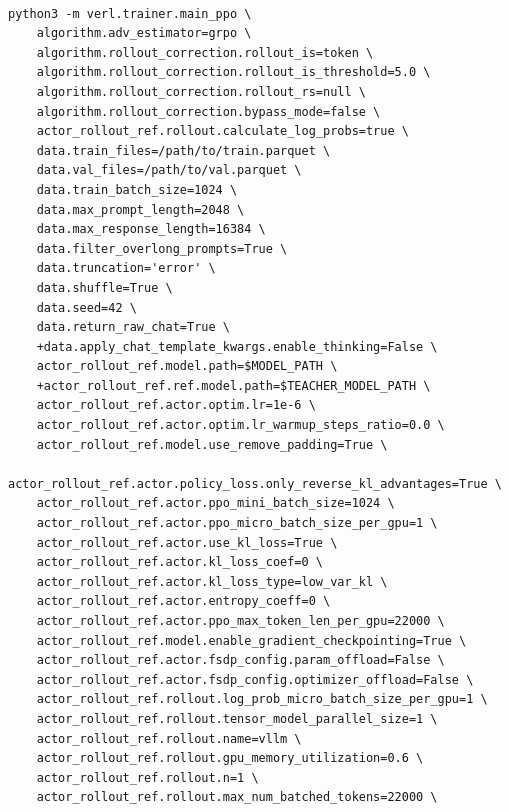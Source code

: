 \documentclass{article}
\begin{document}
\begin{tcolorbox}[
    colback=gray!5,          %
    colframe=gray!70,        %
    arc=3pt,                 %
    left=2pt,
    right=2pt,
    top=2pt,
    bottom=2pt,
    boxrule=0.5pt,           %
    breakable,               %
    fontupper=\small,
    listing only,            %
    listing options={language=Python}, %
    title=OPD Training Command, %
    title style={color=black},          %
    label=py1                %
]
\begin{verbatim}

python3 -m verl.trainer.main_ppo \
    algorithm.adv_estimator=grpo \
    algorithm.rollout_correction.rollout_is=token \
    algorithm.rollout_correction.rollout_is_threshold=5.0 \
    algorithm.rollout_correction.rollout_rs=null \
    algorithm.rollout_correction.bypass_mode=false \
    actor_rollout_ref.rollout.calculate_log_probs=true \
    data.train_files=/path/to/train.parquet \
    data.val_files=/path/to/val.parquet \
    data.train_batch_size=1024 \
    data.max_prompt_length=2048 \
    data.max_response_length=16384 \
    data.filter_overlong_prompts=True \
    data.truncation='error' \
    data.shuffle=True \
    data.seed=42 \
    data.return_raw_chat=True \
    +data.apply_chat_template_kwargs.enable_thinking=False \
    actor_rollout_ref.model.path=$MODEL_PATH \
    +actor_rollout_ref.ref.model.path=$TEACHER_MODEL_PATH \
    actor_rollout_ref.actor.optim.lr=1e-6 \
    actor_rollout_ref.actor.optim.lr_warmup_steps_ratio=0.0 \
    actor_rollout_ref.model.use_remove_padding=True \
    actor_rollout_ref.actor.policy_loss.only_reverse_kl_advantages=True \
    actor_rollout_ref.actor.ppo_mini_batch_size=1024 \
    actor_rollout_ref.actor.ppo_micro_batch_size_per_gpu=1 \
    actor_rollout_ref.actor.use_kl_loss=True \
    actor_rollout_ref.actor.kl_loss_coef=0 \
    actor_rollout_ref.actor.kl_loss_type=low_var_kl \
    actor_rollout_ref.actor.entropy_coeff=0 \
    actor_rollout_ref.actor.ppo_max_token_len_per_gpu=22000 \
    actor_rollout_ref.model.enable_gradient_checkpointing=True \
    actor_rollout_ref.actor.fsdp_config.param_offload=False \
    actor_rollout_ref.actor.fsdp_config.optimizer_offload=False \
    actor_rollout_ref.rollout.log_prob_micro_batch_size_per_gpu=1 \
    actor_rollout_ref.rollout.tensor_model_parallel_size=1 \
    actor_rollout_ref.rollout.name=vllm \
    actor_rollout_ref.rollout.gpu_memory_utilization=0.6 \
    actor_rollout_ref.rollout.n=1 \
    actor_rollout_ref.rollout.max_num_batched_tokens=22000 \

\end{verbatim}
\end{tcolorbox}
\end{document}
